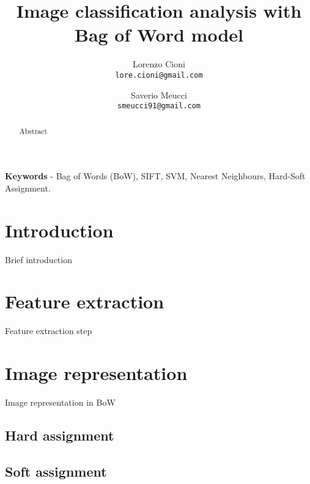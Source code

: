 \documentclass[10pt,twocolumn,letterpaper]{article}
\begin{document}
\title{Image classification analysis with Bag of Word model}

\author{Lorenzo Cioni\\
{\tt\small lore.cioni@gmail.com}
\and
Saverio Meucci\\
{\tt\small smeucci91@gmail.com}
}

\maketitle
\thispagestyle{empty}

\begin{abstract}
  Abstract
\end{abstract}

{\footnotesize \noindent\textbf{Keywords} - Bag of Words (BoW), SIFT, SVM, Nearest Neighbours, Hard-Soft Assignment}.

\section{Introduction}

Brief introduction

\vspace{3cm}

\section{Feature extraction}

Feature extraction step

\section{Image representation}

Image representation in BoW

\subsection{Hard assignment}

\subsection{Soft assignment}
\end{document}
